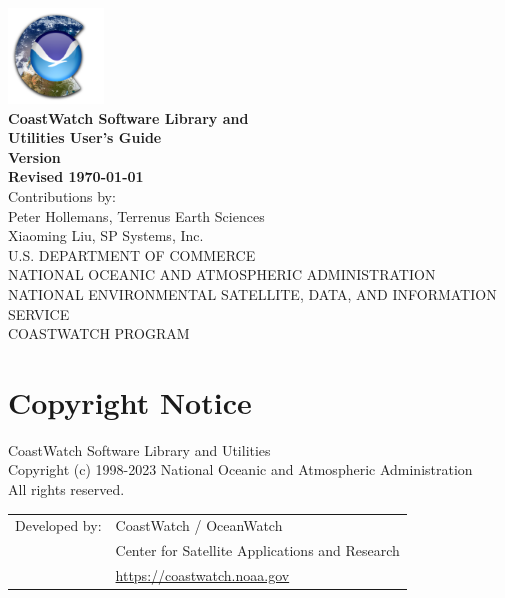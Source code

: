 

\begin{titlepage}

  \begin{center}
    \includegraphics[height=1in]{icons/cdat.png} \\
    \vspace{0.5cm}
    {\Large \bf CoastWatch Software Library and \\ Utilities User's Guide} \\
    \vspace{1cm}
    {\large \bf Version \version \\ Revised \today} \\
    \vspace{6cm} 
    {\small Contributions by: \\ Peter Hollemans, Terrenus Earth Sciences} \\
    {\small Xiaoming Liu, SP Systems, Inc.} \\
    \vspace{2cm}
    {\small U.S. DEPARTMENT OF COMMERCE \\
    NATIONAL OCEANIC AND ATMOSPHERIC ADMINISTRATION \\
    NATIONAL ENVIRONMENTAL SATELLITE, DATA, AND INFORMATION SERVICE \\
    COASTWATCH PROGRAM} \\
  \end{center}

\end{titlepage}



\setcounter{page}{1}

\section*{Copyright Notice}

CoastWatch Software Library and Utilities\\
Copyright (c) 1998-2023 National Oceanic and Atmospheric Administration\\
All rights reserved.

\noindent\begin{tabular}{@{}ll}
Developed by: & CoastWatch / OceanWatch \\
              & Center for Satellite Applications and Research \\
              & \url{https://coastwatch.noaa.gov}
\end{tabular}

